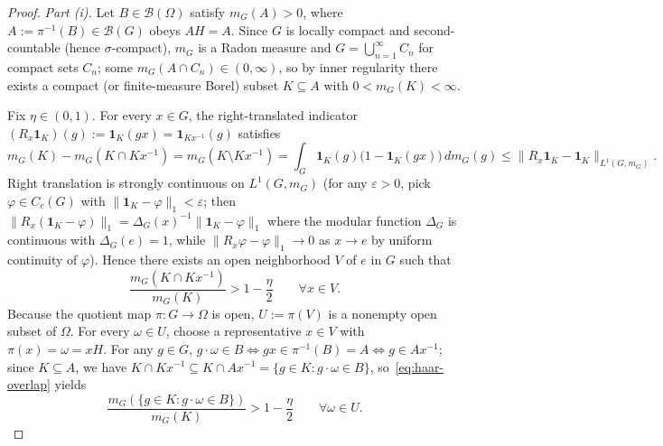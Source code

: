 \documentclass[11pt,a4paper]{article}
\theoremstyle{definition}
\theoremstyle{remark}
\newcommand{\Bor}{\mathcal{B}}
\newcommand{\one}{\mathbf{1}}
\newcommand{\norm}[1]{\|#1\|}
\begin{document}
\begin{proof}
\emph{Part (i).} Let $B\in\Bor(\Omega)$ satisfy $m_G(A)>0$, where $A:=\pi^{-1}(B)\in\Bor(G)$ obeys $AH=A$. Since $G$ is locally compact and second-countable (hence $\sigma$-compact), $m_G$ is a Radon measure and $G=\bigcup_{n=1}^\infty C_n$ for compact sets $C_n$; some $m_G(A\cap C_n)\in(0,\infty)$, so by inner regularity there exists a compact (or finite-measure Borel) subset $K\subseteq A$ with $0<m_G(K)<\infty$.

Fix $\eta\in(0,1)$. For every $x\in G$, the right-translated indicator $(R_x\one_K)(g):=\one_K(gx)=\one_{Kx^{-1}}(g)$ satisfies
\[
m_G(K) - m_G(K\cap Kx^{-1}) = m_G(K\setminus Kx^{-1})
= \int_G \one_K(g)\bigl(1-\one_K(gx)\bigr)\,dm_G(g) \le \norm{R_x\one_K - \one_K}_{L^1(G,m_G)}.
\]
Right translation is strongly continuous on $L^1(G,m_G)$ (for any $\varepsilon>0$, pick $\varphi\in C_c(G)$ with $\norm{\one_K-\varphi}_1<\varepsilon$; then $\norm{R_x(\one_K-\varphi)}_1=\Delta_G(x)^{-1}\norm{\one_K-\varphi}_1$ where the modular function $\Delta_G$ is continuous with $\Delta_G(e)=1$, while $\norm{R_x\varphi-\varphi}_1\to 0$ as $x\to e$ by uniform continuity of $\varphi$). Hence there exists an open neighborhood $V$ of $e$ in $G$ such that
\begin{equation}\label{eq:haar-overlap}
\frac{m_G(K\cap Kx^{-1})}{m_G(K)} > 1 - \frac{\eta}{2} \qquad \forall x\in V.
\end{equation}
Because the quotient map $\pi:G\to\Omega$ is open, $U:=\pi(V)$ is a nonempty open subset of $\Omega$. For every $\omega\in U$, choose a representative $x\in V$ with $\pi(x)=\omega=xH$. For any $g\in G$, $g\cdot\omega\in B \iff gx\in\pi^{-1}(B)=A \iff g\in Ax^{-1}$; since $K\subseteq A$, we have $K\cap Kx^{-1}\subseteq K\cap Ax^{-1}=\{g\in K : g\cdot\omega\in B\}$, so~\eqref{eq:haar-overlap} yields
\[
\frac{m_G(\{g\in K : g\cdot\omega\in B\})}{m_G(K)} > 1 - \frac{\eta}{2} \qquad \forall \omega\in U.
\]


\end{proof}
\end{document}
